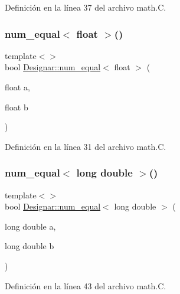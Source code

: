 Definición en la línea 37 del archivo math.\+C.

\mbox{\label{namespace_designar_a29878d27cf434c0bac7093ec7b4d8613}} 
\subsubsection{\texorpdfstring{num\+\_\+equal$<$ float $>$()}{num\_equal< float >()}}
{\footnotesize\ttfamily template$<$$>$ \\
bool \hyperlink{namespace_designar_ad193c81ed087e63575903c6775df36b2}{Designar\+::num\+\_\+equal}$<$ float $>$ (\begin{DoxyParamCaption}\item[{float}]{a,  }\item[{float}]{b }\end{DoxyParamCaption})}



Definición en la línea 31 del archivo math.\+C.

\mbox{\label{namespace_designar_a161c5a6c7e958d708e5898265c9a37f7}} 
\subsubsection{\texorpdfstring{num\+\_\+equal$<$ long double $>$()}{num\_equal< long double >()}}
{\footnotesize\ttfamily template$<$$>$ \\
bool \hyperlink{namespace_designar_ad193c81ed087e63575903c6775df36b2}{Designar\+::num\+\_\+equal}$<$ long double $>$ (\begin{DoxyParamCaption}\item[{long double}]{a,  }\item[{long double}]{b }\end{DoxyParamCaption})}



Definición en la línea 43 del archivo math.\+C.

\mbox{\label{namespace_designar_a4b2db2e125d6ac9edf439f63804ba674}} 
